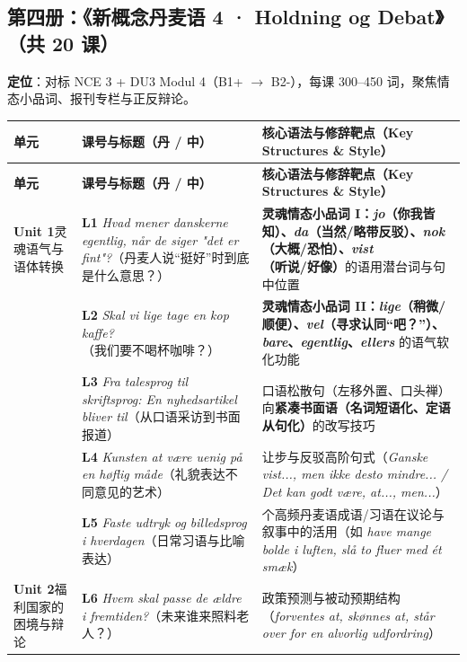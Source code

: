 \documentclass[10.5pt, a4paper]{ctexart}
\begin{document}
\subsection{第四册：《新概念丹麦语 4 · Holdning og Debat》（共 20 课）}
\textbf{定位}：对标 NCE 3 + DU3 Modul 4（B1+ $\rightarrow$ B2-），每课 300--450 词，聚焦情态小品词、报刊专栏与正反辩论。

{\small
\renewcommand{\arraystretch}{1.28}
\begin{longtable}{@{} >{\raggedright\arraybackslash}p{2.65cm} >{\raggedright\arraybackslash}p{5.7cm} >{\raggedright\arraybackslash}p{7.25cm} @{}}
\toprule
\textbf{单元} & \textbf{课号与标题（丹 / 中）} & \textbf{核心语法与修辞靶点（Key Structures \& Style）} \\
\midrule
\endfirsthead
\toprule
\textbf{单元} & \textbf{课号与标题（丹 / 中）} & \textbf{核心语法与修辞靶点（Key Structures \& Style）} \\
\midrule
\endhead
\bottomrule
\endfoot
\textbf{Unit 1}\newline 灵魂语气与\newline 语体转换 & \textbf{L1} \textit{Hvad mener danskerne egentlig, når de siger "det er fint"?}（丹麦人说“挺好”时到底是什么意思？） & \textbf{灵魂情态小品词 I：\textit{jo}（你我皆知）、\textit{da}（当然/略带反驳）、\textit{nok}（大概/恐怕）、\textit{vist}（听说/好像）}的语用潜台词与句中位置 \\
 & \textbf{L2} \textit{Skal vi lige tage en kop kaffe?}（我们要不喝杯咖啡？） & \textbf{灵魂情态小品词 II：\textit{lige}（稍微/顺便）、\textit{vel}（寻求认同“吧？”）、\textit{bare}、\textit{egentlig}、\textit{ellers}} 的语气软化功能 \\
 & \textbf{L3} \textit{Fra talesprog til skriftsprog: En nyhedsartikel bliver til}（从口语采访到书面报道） & 口语松散句（左移外置、口头禅）向\textbf{紧凑书面语（名词短语化、定语从句化）}的改写技巧 \\
 & \textbf{L4} \textit{Kunsten at være uenig på en høflig måde}（礼貌表达不同意见的艺术） & 让步与反驳高阶句式（\textit{Ganske vist..., men ikke desto mindre... / Det kan godt være, at..., men...}） \\
 & \textbf{L5} \textit{Faste udtryk og billedsprog i hverdagen}（日常习语与比喻表达） & 25 个高频丹麦语成语/习语在议论与叙事中的活用（如 \textit{have mange bolde i luften, slå to fluer med ét smæk}） \\
\midrule
\textbf{Unit 2}\newline 福利国家的\newline 困境与辩论 & \textbf{L6} \textit{Hvem skal passe de ældre i fremtiden?}（未来谁来照料老人？） & 政策预测与被动预期结构（\textit{forventes at, skønnes at, står over for en alvorlig udfordring}） \\

\end{longtable}}
\end{document}

